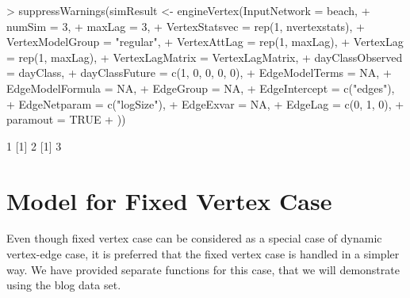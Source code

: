 \documentclass[12pt]{article}
\begin{document}
\begin{Schunk}
\begin{Sinput}
> suppressWarnings(simResult <- engineVertex(InputNetwork = beach,
+                           numSim = 3,
+                           maxLag = 3,
+                           VertexStatsvec = rep(1, nvertexstats),
+                           VertexModelGroup = "regular",
+                           VertexAttLag = rep(1, maxLag),
+                           VertexLag = rep(1, maxLag),
+                           VertexLagMatrix = VertexLagMatrix,
+                           dayClassObserved = dayClass,
+                           dayClassFuture = c(1, 0, 0, 0, 0),
+                           EdgeModelTerms = NA,
+                           EdgeModelFormula = NA,
+                           EdgeGroup = NA,
+                           EdgeIntercept = c("edges"),
+                           EdgeNetparam = c("logSize"),
+                           EdgeExvar = NA,
+                           EdgeLag = c(0, 1, 0),
+                           paramout = TRUE
+                           ))
\end{Sinput}
\begin{Soutput}
[1] 1
[1] 2
[1] 3
\end{Soutput}
\end{Schunk}

\section{Model for Fixed Vertex Case}
\label{sec:model-fixed-vertex}

Even though fixed vertex case can be considered as a special case of dynamic vertex-edge case, it is preferred that the fixed vertex case is handled in a simpler way. We have provided separate functions for this case, that we will demonstrate using the blog data set.
\end{document}
